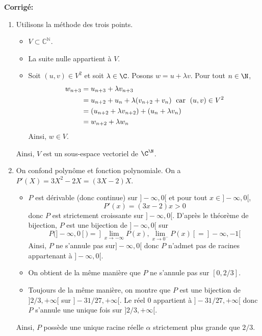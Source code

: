 \documentclass[a4paper,twoside,french,11pt]{VcCours}
\newcommand{\corr}{\textbf{Corrigé:}}
\begin{document}
\corr \begin{enumerate}
 \item Utilisons la méthode des trois points.
 \begin{itemize}
 \item $V \subset \mathbb{C}^{\mathbb{N}}$.
 \item La suite nulle appartient à $V$.
 \item Soit $(u,v)\in V^2$ et soit $\lambda\in\C$. Posons $w=u + \lambda v$. Pour tout $n\in\N$, 
 \begin{align*}
 w_{n+3} & =u_{n+3}+\lambda v_{n+3} \\
 & =u_{n+2}+u_n+\lambda(v_{n+2}+v_n) \; \hbox{ car } \; (u,v)\in V^2 \\
 & =(u_{n+2}+\lambda v_{n+2})+(u_n+\lambda v_n) \\
 & =w_{n+2}+\lambda w_n
 \end{align*}
 Ainsi, $w \in V$. 
 \end{itemize}
Ainsi, $V$ est un sous-espace vectoriel de $\C^{\N}$.
 \item On confond polynôme et fonction polynomiale. On a $P'(X)=3X^2-2X=(3X-2)X$.
 \begin{itemize}
\item $P$ est dérivable (donc continue) sur $]-\infty,0[$ et pour tout $x \in ]-\infty,0[$,
$$ P'(x) = (3x-2)x>0$$
donc $P$ est strictement croissante sur $]-\infty,0[$. D'après le théorème de bijection, $P$ est une bijection de $]-\infty,0[$ sur 
$$ P(]-\infty,0[)=  ]\lim_{x \rightarrow - \infty} P(x), \lim_{x \rightarrow 0^{-}} P(x)[=   ]-\infty,-1[$$
Ainsi, $P$ ne s'annule pas sur$]-\infty,0[$ donc $P$ n'admet pas de racines appartenant à $]-\infty,0[$.
\item On obtient de la même manière que $P$ ne s'annule pas sur $[0, 2/3]$.
\item Toujours de la même manière, on montre que $P$ est une bijection de $]2/3, + \infty[$ sur $]-31/27,+\infty[$. Le réel $0$ appartient à $]-31/27,+\infty[$ donc $P$ s'annule une unique fois sur $]2/3, + \infty[$.
\end{itemize}
Ainsi, $P$ possède une unique racine réelle $\alpha$ strictement plus grande que $2/3$. 


\end{enumerate}
\end{document}
